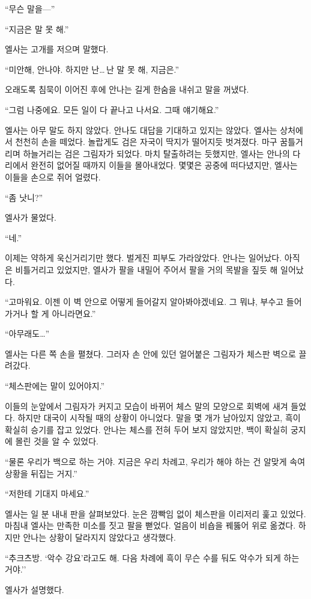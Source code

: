 ``무슨 말을—''

``지금은 말 못 해.''

엘사는 고개를 저으며 말했다.

``미안해, 안나야. 하지만 난\ldots\,난 말 못 해, 지금은.''

오래도록 침묵이 이어진 후에 안나는 길게 한숨을 내쉬고 말을 꺼냈다.

``그럼 나중에요. 모든 일이 다 끝나고 나서요. 그때 얘기해요.''

엘사는 아무 말도 하지 않았다. 안나도 대답을 기대하고 있지는 않았다. 엘사는 상처에서 천천히 손을 떼었다. 놀랍게도 검은 자국이 딱지가 떨어지듯 벗겨졌다. 마구 꿈틀거리며 하늘거리는 검은 그림자가 되었다. 마치 탈출하려는 듯했지만, 엘사는 안나의 다리에서 완전히 없어질 때까지 이들을 몰아내었다. 몇몇은 공중에 떠다녔지만, 엘사는 이들을 손으로 쥐어 얼렸다.

``좀 낫니?''

엘사가 물었다.

``네.''

이제는 약하게 욱신거리기만 했다. 벌게진 피부도 가라앉았다. 안나는 일어났다. 아직은 비틀거리고 있었지만, 엘사가 팔을 내밀어 주어서 팔을 거의 목발을 짚듯 해 일어났다.

``고마워요. 이젠 이 벽 안으로 어떻게 들어갈지 알아봐야겠네요. 그 뭐냐, 부수고 들어가거나 할 게 아니라면요.''

``아무래도\ldots''

엘사는 다른 쪽 손을 펼쳤다. 그러자 손 안에 있던 얼어붙은 그림자가 체스판 벽으로 끌려갔다.

``체스판에는 말이 있어야지.''

이들의 눈앞에서 그림자가 커지고 모습이 바뀌어 체스 말의 모양으로 회벽에 새겨 들었다. 하지만 대국이 시작될 때의 상황이 아니었다. 말을 몇 개가 남아있지 않았고, 흑이 확실히 승기를 잡고 있었다. 안나는 체스를 전혀 두어 보지 않았지만, 백이 확실히 궁지에 몰린 것을 알 수 있었다.

``물론 우리가 백으로 하는 거야. 지금은 우리 차례고, 우리가 해야 하는 건 알맞게 속여 상황을 뒤집는 거지.''

`` 저한테 기대지 마세요.''

엘사는 일 분 내내 판을 살펴보았다. 눈은 깜빡임 없이 체스판을 이리저리 훑고 있었다. 마침내 엘사는 만족한 미소를 짓고 팔을 뻗었다. 얼음이 비숍을 꿰뚫어 위로 옮겼다. 하지만 안나는 상황이 달라지지 않았다고 생각했다.

``추크츠방. `악수 강요'라고도 해. 다음 차례에 흑이 무슨 수를 둬도 악수가 되게 하는 거야.''

엘사가 설명했다.

